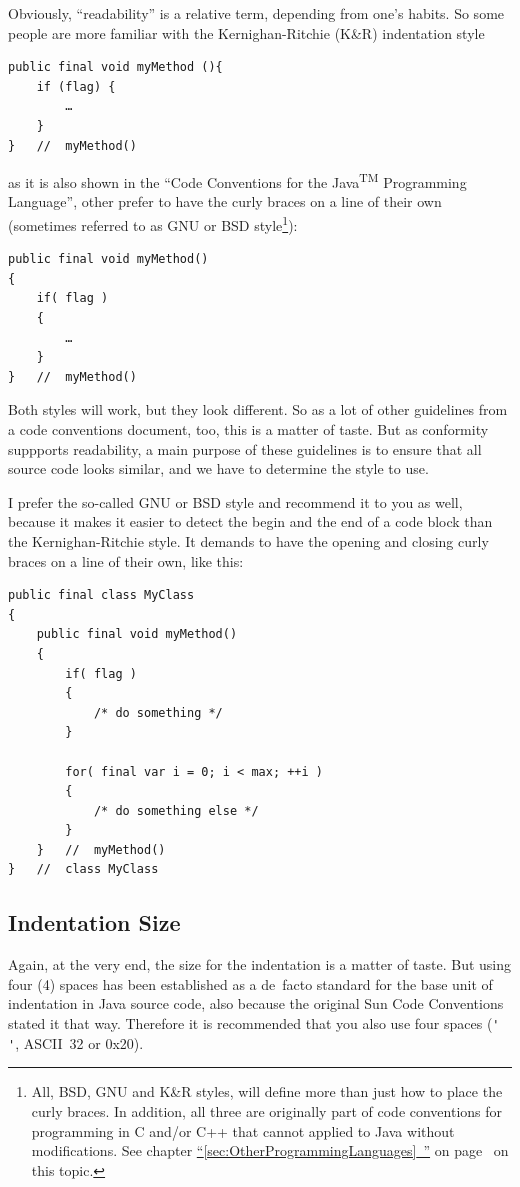 \documentclass[11pt,a4paper, titlepage, parskip=half, headsepline, footsepline, cleardoublepage=current, headheight=1cm]{scrbook}
\newcommand*{\tqfullvref}[1]{\hyperref[{#1}]{“\ref*{#1}~\nameref*{#1}”} on page~\pageref{#1}}
\begin{document}
Obviously, “readability” is a relative term, depending from one's habits. So some people are more familiar with the Kernighan-Ritchie (K\&R) indentation style

\begin{lstlisting}
public final void myMethod (){
    if (flag) {
        …
    }
}   //  myMethod()
\end{lstlisting}

as it is also shown in the “Code Conventions for the Java\textsuperscript{TM} Programming Language”\autocite{SUN_CODE_CONVENTIONS}, other prefer to have the curly braces on a line of their own (sometimes referred to as GNU or BSD style\footnote{All, BSD, GNU and K\&R styles, will define more than just how to place the curly braces. In addition, all three are originally part of code conventions for programming in C and/or C++ that cannot applied to Java without modifications. See chapter \tqfullvref{sec:OtherProgrammingLanguages} on this topic.}):

\begin{lstlisting}
public final void myMethod()
{
    if( flag )
    {
    	…
    }
}   //  myMethod()
\end{lstlisting}

Both styles will work, but they look different. So as a lot of other guidelines from a code conventions document, too, this is a matter of taste. But as conformity suppports readability, a main purpose of these guidelines is to ensure that all source code looks similar, and we have to determine the style to use.

I prefer the so-called GNU or BSD style and recommend it to you as well, because it makes it easier to detect the begin and the end of a code block than the Kernighan-Ritchie style. It demands to have the opening and closing curly braces on a line of their own, like this:

\begin{lstlisting}
public final class MyClass
{
    public final void myMethod()
    {
        if( flag )
        {
            /* do something */
        }
        
        for( final var i = 0; i < max; ++i )
        {
            /* do something else */
        } 
    }   //  myMethod()
}   //  class MyClass
\end{lstlisting}

\subsection{Indentation Size}\label{sec:IndentationSize}
Again, at the very end, the size for the indentation is a matter of taste. But using four (4) spaces has been established as a de~facto standard for the base unit of indentation in Java source code, also because the original Sun Code Conventions\autocite{SUN_CODE_CONVENTIONS:Indentation} stated it that way. Therefore it is recommended that you also use four spaces (\lstinline|' '|, ASCII~32 or 0x20).
\end{document}
